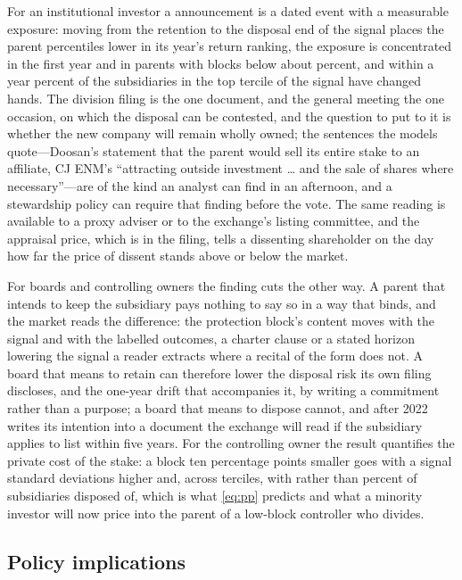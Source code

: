 For an institutional investor a \captive{} announcement is a dated event with a measurable exposure: moving from the retention to the disposal end of the signal places the parent \RankSpecThreePctl{} percentiles lower in its year's return ranking, the exposure is concentrated in the first year and in parents with blocks below about \LowBlockMax{} percent, and within a year \KMHighOneY{} percent of the subsidiaries in the top tercile of the signal have changed hands. The division filing is the one document, and the general meeting the one occasion, on which the disposal can be contested, and the question to put to it is whether the new company will remain wholly owned; the sentences the models quote---Doosan's statement that the parent would sell its entire stake to an affiliate, CJ ENM's ``attracting outside investment \ldots{} and the sale of shares where necessary''---are of the kind an analyst can find in an afternoon, and a stewardship policy can require that finding before the vote. The same reading is available to a proxy adviser or to the exchange's listing committee, and the appraisal price, which is in the filing, tells a dissenting shareholder on the day how far the price of dissent stands above or below the market.

For boards and controlling owners the finding cuts the other way. A parent that intends to keep the subsidiary pays nothing to say so in a way that binds, and the market reads the difference: the protection block's content moves with the signal and with the labelled outcomes, a charter clause or a stated horizon lowering the signal a reader extracts where a recital of the form does not. A board that means to retain can therefore lower the disposal risk its own filing discloses, and the one-year drift that accompanies it, by writing a commitment rather than a purpose; a board that means to dispose cannot, and after 2022 writes its intention into a document the exchange will read if the subsidiary applies to list within five years. For the controlling owner the result quantifies the private cost of the stake: a block ten percentage points smaller goes with a signal \ScoreOnBlockTenPPSDAbs{} standard deviations higher and, across terciles, with \LowBlockDisp{} rather than \HighBlockDisp{} percent of subsidiaries disposed of, which is what \eqref{eq:pp} predicts and what a minority investor will now price into the parent of a low-block controller who divides.

\subsection{Policy implications}\label{sec:policy}

